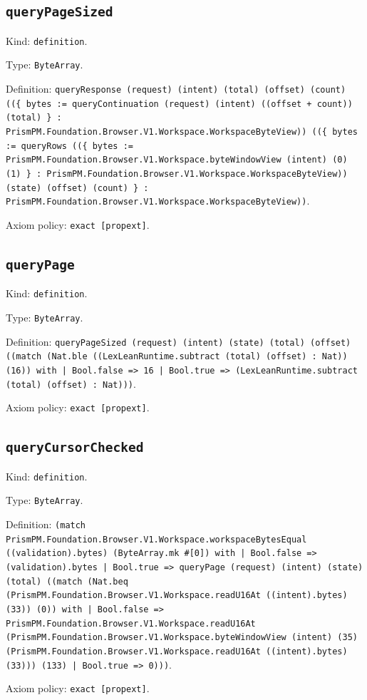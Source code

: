 \documentclass[11pt]{article}
\begin{document}
\subsection*{\texttt{queryPageSized}}
\noindent Kind: \texttt{definition}.\par
\noindent Type: \texttt{ByteArray}.\par
\noindent Definition: \texttt{queryResponse (request) (intent) (total) (offset) (count) ((\{ bytes := queryContinuation (request) (intent) ((offset + count)) (total) \} : PrismPM.Foundation.Browser.V1.Workspace.WorkspaceByteView)) ((\{ bytes := queryRows ((\{ bytes := PrismPM.Foundation.Browser.V1.Workspace.byteWindowView (intent) (0) (1) \} : PrismPM.Foundation.Browser.V1.Workspace.WorkspaceByteView)) (state) (offset) (count) \} : PrismPM.Foundation.Browser.V1.Workspace.WorkspaceByteView))}.\par
\noindent Axiom policy: \texttt{exact [propext]}.\par
\subsection*{\texttt{queryPage}}
\noindent Kind: \texttt{definition}.\par
\noindent Type: \texttt{ByteArray}.\par
\noindent Definition: \texttt{queryPageSized (request) (intent) (state) (total) (offset) ((match (Nat.ble ((LexLeanRuntime.subtract (total) (offset) : Nat)) (16)) with | Bool.false => 16 | Bool.true => (LexLeanRuntime.subtract (total) (offset) : Nat)))}.\par
\noindent Axiom policy: \texttt{exact [propext]}.\par
\subsection*{\texttt{queryCursorChecked}}
\noindent Kind: \texttt{definition}.\par
\noindent Type: \texttt{ByteArray}.\par
\noindent Definition: \texttt{(match PrismPM.Foundation.Browser.V1.Workspace.workspaceBytesEqual ((validation).bytes) (ByteArray.mk \#[0]) with | Bool.false => (validation).bytes | Bool.true => queryPage (request) (intent) (state) (total) ((match (Nat.beq (PrismPM.Foundation.Browser.V1.Workspace.readU16At ((intent).bytes) (33)) (0)) with | Bool.false => PrismPM.Foundation.Browser.V1.Workspace.readU16At (PrismPM.Foundation.Browser.V1.Workspace.byteWindowView (intent) (35) (PrismPM.Foundation.Browser.V1.Workspace.readU16At ((intent).bytes) (33))) (133) | Bool.true => 0)))}.\par
\noindent Axiom policy: \texttt{exact [propext]}.\par
\end{document}
